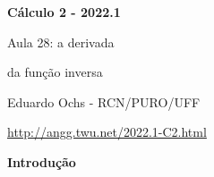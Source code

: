 \documentclass[oneside,12pt]{article}
\begin{document}
%

\thispagestyle{empty}

\begin{center}

\vspace*{1.2cm}

{\bf \Large Cálculo 2 - 2022.1}

\bsk

Aula 28: a derivada

da função inversa

\bsk

Eduardo Ochs - RCN/PURO/UFF

\url{http://angg.twu.net/2022.1-C2.html}

\end{center}

\newpage


{\bf Introdução}
\end{document}

